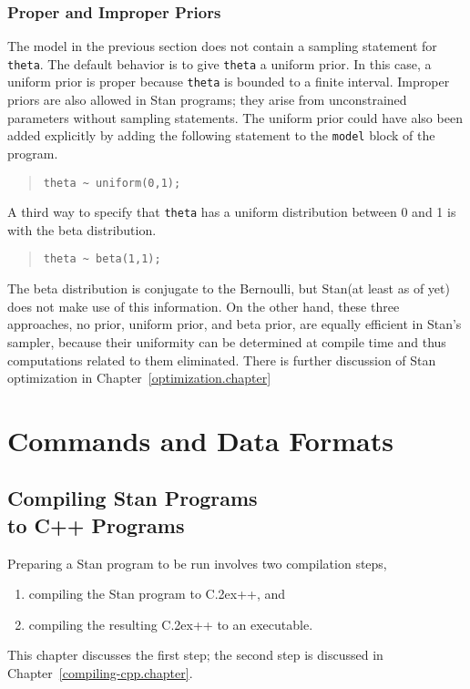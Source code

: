 \documentclass[10pt]{report}
\newcommand{\Stan}{Stan\xspace}
\newcommand*{\Cpp}{C\raise.2ex\hbox{\footnotesize ++}\xspace} %
\newcommand{\code}[1]{{\tt #1}}
\newcommand{\refchapter}[1]{Chapter~\ref{#1.chapter}}
\begin{document}
\section{Proper and Improper Priors}

The model in the previous section does not contain a sampling
statement for \code{theta}.  The default behavior is to give
\code{theta} a uniform prior.  In this case, a uniform prior is proper
because \code{theta} is bounded to a finite interval.  Improper priors
are also allowed in \Stan programs; they arise from unconstrained
parameters without sampling statements.  The uniform prior could have
also been added explicitly by adding the following statement to the
\code{model} block of the program.
%
\begin{quote}
\begin{Verbatim} 
theta ~ uniform(0,1);
\end{Verbatim}
\end{quote}
% 
A third way to specify that \code{theta} has a uniform distribution
between 0 and 1 is with the beta distribution.
%
\begin{quote}
\begin{Verbatim}
theta ~ beta(1,1);
\end{Verbatim}
\end{quote}
%
The beta distribution is conjugate to the Bernoulli, but \Stan (at
least as of yet) does not make use of this information.  On the other hand,
these three approaches, no prior, uniform prior, and beta prior,
are equally efficient in \Stan's sampler, because their uniformity
can be determined at compile time and thus computations related to
them eliminated.  There is further discussion of \Stan optimization
in \refchapter{optimization}


\part{Commands and Data Formats}


\chapter{Compiling Stan Programs 
\\ to C++ Programs}\label{stanc.chapter}

Preparing a \Stan program to be run involves two compilation steps,
%
\begin{enumerate}
\item compiling the \Stan program to \Cpp, and
\item compiling the resulting \Cpp to an executable.
\end{enumerate}
%
This chapter discusses the first step; the second step is discussed in
\refchapter{compiling-cpp}.
\end{document}
